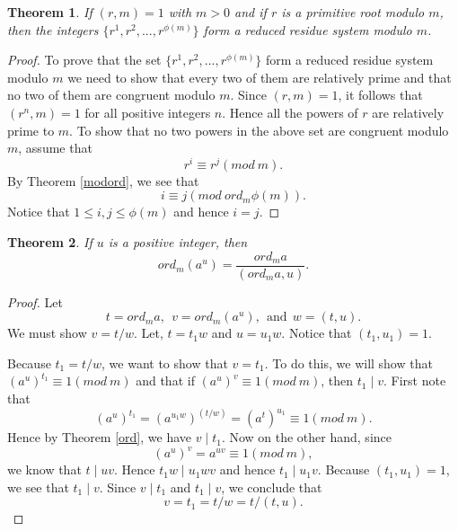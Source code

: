 \documentclass[12pt,letterpaper]{book}
\newtheorem{theorem}{Theorem}
\begin{document}
\begin{theorem}\label{PrimitiveResidue}
If $(r,m)=1$ with $m>0$ and if $r$ is a primitive root modulo $m$,
then the integers $\{r^1,r^2,...,r^{\phi(m)}\}$ form a reduced
residue system modulo $m$.
\end{theorem}

\begin{proof}
To prove that the set $\{r^1,r^2,...,r^{\phi(m)}\}$ form a reduced
residue system modulo $m$ we need to show that every two of them are
relatively prime and that no two of them are congruent modulo $m$.
Since $(r,m)=1$, it follows that $(r^n,m)=1$ for all positive
integers $n$.  Hence all the powers of $r$ are relatively prime to
$m$.  To show that no two powers in the above set are congruent
modulo $m$, assume that
\begin{equation*}
r^i\equiv r^j(mod \ m).
\end{equation*}
By Theorem \ref{modord}, we see that
\begin{equation*}
i\equiv j(mod \ ord_m\phi(m)).
\end{equation*}
Notice that $1\leq i,j\leq \phi(m)$ and hence $i=j$.
\end{proof}

\begin{theorem}\label{ordfrac}
If $u$ is a positive integer, then
\begin{equation*}
ord_m(a^u)=\frac{ord_ma}{(ord_ma,u)}.
\end{equation*}
\end{theorem}

\begin{proof}
Let
\begin{equation*}
t=ord_ma,\ \ v=ord_m(a^u),\ \  \mbox{and} \ \ w=(t,u).
\end{equation*}
We must show $v=t/w$.  Let, $t=t_1w$ and $u=u_1w$.  Notice that $(t_1,u_1)=1.$
\par Because $t_1=t/w$, we want to show that $v=t_1$.
To do this, we will show that $(a^{u})^{t_1}\equiv 1(mod \ m)$ and
that if $(a^u)^v\equiv 1(mod \ m)$, then $t_1\mid v$.  First note
that
\begin{equation*}
(a^u)^{t_1}=(a^{u_1w})^{(t/w)}=(a^t)^{u_1}\equiv 1(mod \ m).
\end{equation*}
Hence by Theorem \ref{ord}, we have $v\mid t_1$. Now on the other hand,
since
\begin{equation*}
(a^u)^v=a^{uv}\equiv 1(mod \ m),
\end{equation*}
we know that $t\mid uv$.  Hence $t_1w\mid u_1wv$ and hence $t_1\mid
u_1v$.  Because $(t_1,u_1)=1$, we see that $t_1\mid v$. Since $v\mid
t_1$ and $t_1\mid v$, we conclude that $$v=t_1=t/w=t/(t,u).$$
\end{proof}
\end{document}
